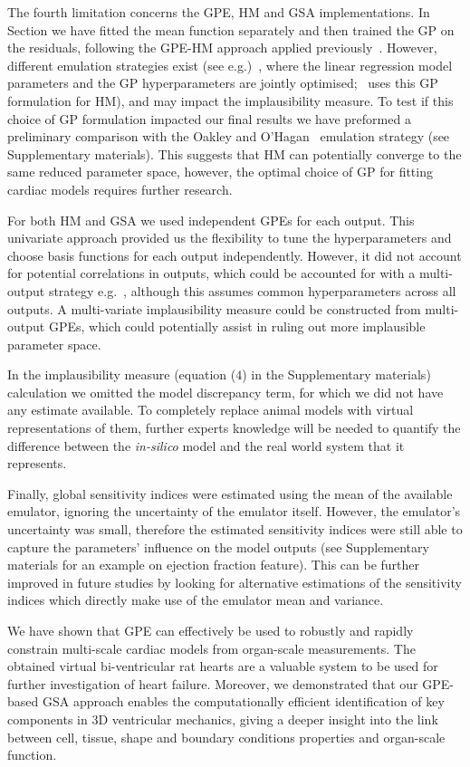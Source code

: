 The fourth limitation concerns the GPE, HM and GSA implementations. In Section we have fitted the mean function separately and then trained the GP on the residuals, following the GPE-HM approach applied previously~\cite{Salter:2016,Vernon:2018}. However, different emulation strategies exist (see e.g.)~\cite{Oakley:2004}, where the linear regression model parameters and the GP hyperparameters are jointly optimised;~\cite{Coveney:2018} uses this GP formulation for HM), and may impact the implausibility measure. To test if this choice of GP formulation impacted our final results we have preformed a preliminary comparison with the Oakley and O'Hagan~\cite{Oakley:2004} emulation strategy (see Supplementary materials). This suggests that HM can potentially converge to the same reduced parameter space, however, the optimal choice of GP for fitting cardiac models requires further research.

For both HM and GSA we used independent GPEs for each output. This univariate approach provided us the flexibility to tune the hyperparameters and choose basis functions for each output independently. However, it did not account for potential correlations in outputs, which could be accounted for with a multi-output strategy e.g.~\cite{Conti:2009}, although this assumes common hyperparameters across all outputs. A multi-variate implausibility measure could be constructed from multi-output GPEs, which could potentially assist in ruling out more implausible parameter space.

In the implausibility measure (equation ($4$) in the Supplementary materials) calculation we omitted the model discrepancy term, for which we did not have any estimate available. To completely replace animal models with virtual representations of them, further experts knowledge will be needed to quantify the difference between the \textit{in-silico} model and the real world system that it represents. 

Finally, global sensitivity indices were estimated using the mean of the available emulator, ignoring the uncertainty of the emulator itself. However, the emulator's uncertainty was small, therefore the estimated sensitivity indices were still able to capture the parameters' influence on the model outputs (see Supplementary materials for an example on ejection fraction feature). This can be further improved in future studies by looking for alternative estimations of the sensitivity indices which directly make use of the emulator mean and variance.

\vspace{0.2cm}
We have shown that GPE can effectively be used to robustly and rapidly constrain multi-scale cardiac models from organ-scale measurements. The obtained virtual bi-ventricular rat hearts are a valuable system to be used for further investigation of heart failure. Moreover, we demonstrated that our GPE-based GSA approach enables the computationally efficient identification of key components in 3D ventricular mechanics, giving a deeper insight into the link between cell, tissue, shape and boundary conditions properties and organ-scale function.


